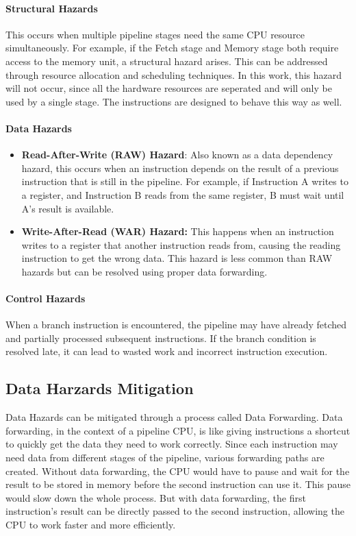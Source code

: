 \paragraph*{Structural Hazards}
This occurs when multiple pipeline stages need the same CPU resource simultaneously.
For example, if the Fetch stage and Memory stage both require access to the memory unit, a structural hazard arises.
This can be addressed through resource allocation and scheduling techniques.
In this work, this hazard will not occur, since all the hardware resources are seperated and will only be used by a single stage.
The instructions are designed to behave this way as well.

\paragraph*{Data Hazards}
\begin{itemize}
    \item \textbf{Read-After-Write (RAW) Hazard}: Also known as a data dependency hazard,
          this occurs when an instruction depends on the result of a previous instruction that is still in the pipeline.
          For example, if Instruction A writes to a register, and Instruction B reads from the same register,
          B must wait until A's result is available.
    \item \textbf{Write-After-Read (WAR) Hazard:} This happens when an instruction writes to a register that another instruction reads from,
          causing the reading instruction to get the wrong data. This hazard is less common than RAW hazards but can be resolved
          using proper data forwarding.
\end{itemize}

\paragraph*{Control Hazards}
When a branch instruction is encountered, the pipeline may have already fetched and partially processed subsequent instructions.
If the branch condition is resolved late, it can lead to wasted work and incorrect instruction execution.

\subsection{Data Harzards Mitigation}
Data Hazards can be mitigated through a process called Data Forwarding.
Data forwarding, in the context of a pipeline CPU, is like giving instructions a shortcut to quickly get the data they need to work correctly.
Since each instruction may need data from different stages of the pipeline, various forwarding paths are created.
Without data forwarding, the CPU would have to pause and wait for the result to be stored in memory before the second instruction can use it.
This pause would slow down the whole process. But with data forwarding,
the first instruction's result can be directly passed to the second instruction, allowing the CPU to work faster and more efficiently.

